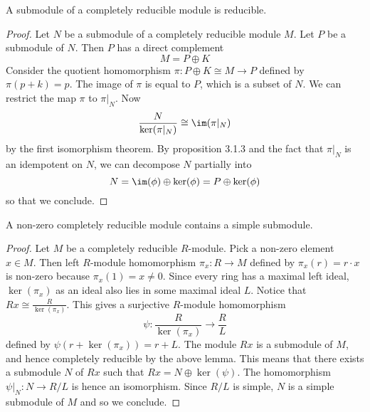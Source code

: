 \documentclass[a4paper]{article}
\begin{document}
\begin{lmm}{}{} A submodule of a completely reducible module is reducible. \tcbline
\begin{proof}
Let $N$ be a submodule of a completely reducible module $M$. Let $P$ be a submodule of $N$. Then $P$ has a direct complement $$M=P\oplus K$$ Consider the quotient homomorphism $\pi:P\oplus K\cong M\to P$ defined by $\pi(p+k)=p$. The image of $\pi$ is equal to $P$, which is a subset of $N$. We can restrict the map $\pi$ to $\pi|_N$. Now $$\frac{N}{\ker(\pi|_N)}\cong\im(\pi|_N)$$ by the first isomorphism theorem. By proposition 3.1.3 and the fact that $\pi|_N$ is an idempotent on $N$, we can decompose $N$ partially into $$N=\im(\phi)\oplus\ker(\phi)=P\oplus\ker(\phi)$$ so that we conclude. 
\end{proof}
\end{lmm}

\begin{lmm}{}{} A non-zero completely reducible module contains a simple submodule. \tcbline
\begin{proof}
Let $M$ be a completely reducible $R$-module. Pick a non-zero element $x\in M$. Then left $R$-module homomorphism $\pi_x:R\to M$ defined by $\pi_x(r)=r\cdot x$ is non-zero because $\pi_x(1)=x\neq 0$. Since every ring has a maximal left ideal, $\ker(\pi_x)$ as an ideal also lies in some maximal ideal $L$. Notice that $Rx\cong\frac{R}{\ker(\pi_x)}$. This gives a surjective $R$-module homomorphism $$\psi:\frac{R}{\ker(\pi_x)}\to\frac{R}{L}$$ defined by $\psi(r+\ker(\pi_x))=r+L$. The module $Rx$ is a submodule of $M$, and hence completely reducible by the above lemma. This means that there exists a submodule $N$ of $Rx$ such that $Rx=N\oplus\ker(\psi)$. The homomorphism $\psi|_N:N\to R/L$ is hence an isomorphism. Since $R/L$ is simple, $N$ is a simple submodule of $M$ and so we conclude. 
\end{proof}
\end{lmm}
\end{document}
